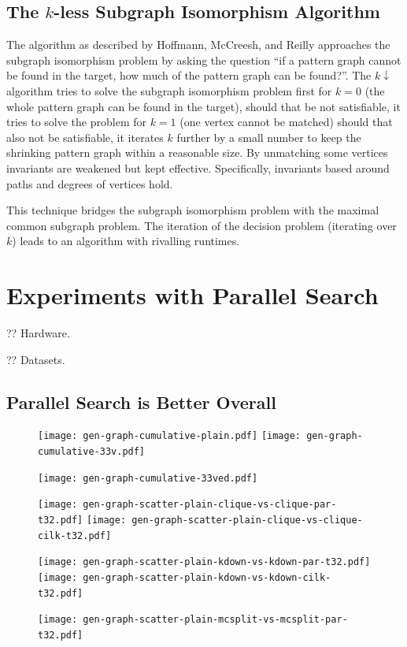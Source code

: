 \documentclass{llncs}
\begin{document}
\subsection{The $k$-less Subgraph Isomorphism Algorithm}

The algorithm as described by Hoffmann, McCreesh, and Reilly \cite{DBLP:conf/aaai/HoffmannMR17} approaches the subgraph isomorphism problem by asking the question ``if a pattern graph cannot be found in the target, how much of the pattern graph can be found?''. The $k{\downarrow}$ algorithm tries to solve the subgraph isomorphism problem first for $k=0$ (the whole pattern graph can be found in the target), should that be not satisfiable, it tries to solve the problem for $k=1$ (one vertex cannot be matched) should that also not be satisfiable, it iterates $k$ further by a small number to keep the shrinking pattern graph within a reasonable size. By unmatching some vertices  invariants are weakened but kept effective. Specifically, invariants based around paths and degrees of vertices hold.

This technique bridges the subgraph isomorphism problem with the maximal common subgraph problem. The iteration of the decision problem (iterating over $k$) leads to an algorithm with rivalling runtimes.

\section{Experiments with Parallel Search}

?? Hardware.

?? Datasets.

\subsection{Parallel Search is Better Overall}

\begin{figure}[p]
    \texttt{[image: gen-graph-cumulative-plain.pdf]}
    \hfill
    \texttt{[image: gen-graph-cumulative-33v.pdf]}

    \vspace*{1em}

    \texttt{[image: gen-graph-cumulative-33ved.pdf]}
    \hfill

\end{figure}

\begin{figure}[p]
    \texttt{[image: gen-graph-scatter-plain-clique-vs-clique-par-t32.pdf]}
    \hfill
    \texttt{[image: gen-graph-scatter-plain-clique-vs-clique-cilk-t32.pdf]}

    \vspace*{1em}

    \texttt{[image: gen-graph-scatter-plain-kdown-vs-kdown-par-t32.pdf]}
    \hfill
    \texttt{[image: gen-graph-scatter-plain-kdown-vs-kdown-cilk-t32.pdf]}

    \vspace*{1em}

    \texttt{[image: gen-graph-scatter-plain-mcsplit-vs-mcsplit-par-t32.pdf]}

\end{figure}
\end{document}
